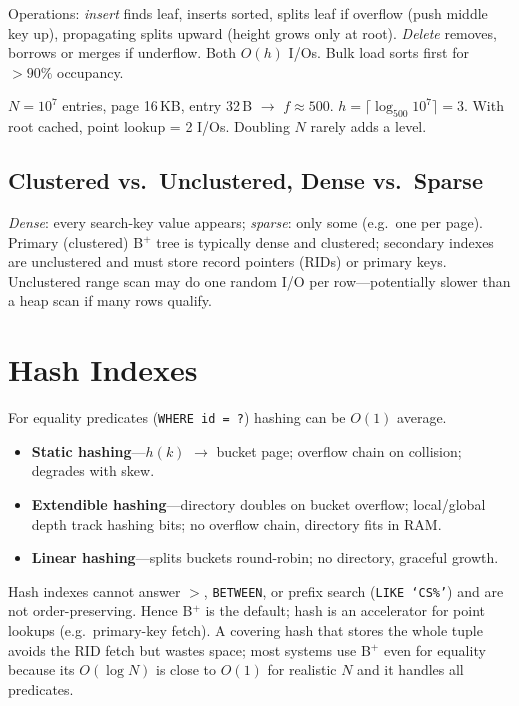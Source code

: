 Operations: \emph{insert} finds leaf, inserts sorted, splits leaf if overflow (push middle key up), propagating splits upward (height grows only at root). \emph{Delete} removes, borrows or merges if underflow. Both $O(h)$ I/Os. Bulk load sorts first for $>90\%$ occupancy.

\begin{example}
$N=10^7$ entries, page 16\,KB, entry 32\,B $\to$ $f\approx 500$. $h=\lceil\log_{500} 10^7\rceil = 3$. With root cached, point lookup = 2 I/Os. Doubling $N$ rarely adds a level.
\end{example}

\subsection{Clustered vs.\ Unclustered, Dense vs.\ Sparse}

\emph{Dense}: every search-key value appears; \emph{sparse}: only some (e.g.\ one per page). Primary (clustered) B$^+$ tree is typically dense and clustered; secondary indexes are unclustered and must store record pointers (RIDs) or primary keys. Unclustered range scan may do one random I/O per row---potentially slower than a heap scan if many rows qualify.

\section{Hash Indexes}
\label{sec:hash}

For equality predicates (\texttt{WHERE id = ?}) hashing can be $O(1)$ average.

\begin{itemize}
    \item \textbf{Static hashing}---$h(k)$ $\to$ bucket page; overflow chain on collision; degrades with skew.
    \item \textbf{Extendible hashing}---directory doubles on bucket overflow; local/global depth track hashing bits; no overflow chain, directory fits in RAM.
    \item \textbf{Linear hashing}---splits buckets round-robin; no directory, graceful growth.
\end{itemize}

Hash indexes cannot answer \texttt{$>$}, \texttt{BETWEEN}, or prefix search (\texttt{LIKE `CS\%'}) and are not order-preserving. Hence B$^+$ is the default; hash is an accelerator for point lookups (e.g.\ primary-key fetch). A covering hash that stores the whole tuple avoids the RID fetch but wastes space; most systems use B$^+$ even for equality because its $O(\log N)$ is close to $O(1)$ for realistic $N$ and it handles all predicates.


